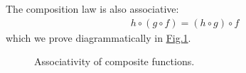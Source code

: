 \documentclass[letterpaper,10pt,english]{jupyterBook}
\begin{document}
\sphinxAtStartPar
The composition law is also associative:
\begin{equation*}
\begin{split}h \circ(g \circ f) = (h \circ g) \circ f\end{split}
\end{equation*}
\sphinxAtStartPar
which we prove diagrammatically in \hyperref[\detokenize{ProofLogic/functions:assocompfns}]{Fig.\@ \ref{\detokenize{ProofLogic/functions:assocompfns}}}.

\begin{figure}[htbp]
\centering
\capstart

\noindent{}
\caption{Associativity of composite functions.}\label{\detokenize{ProofLogic/functions:assocompfns}}\end{figure}
\end{document}

